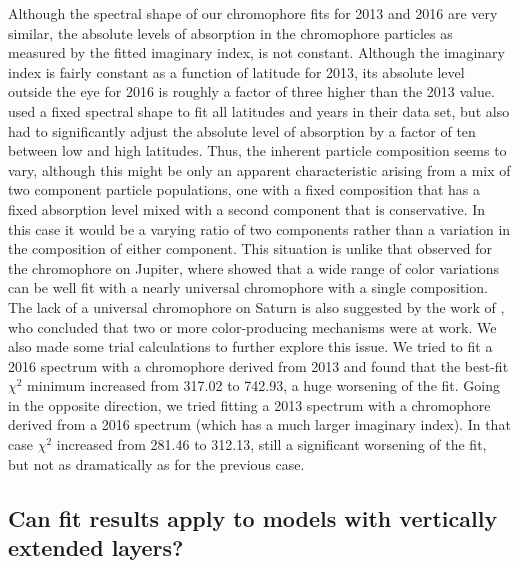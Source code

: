 \documentclass[article,11pt]{emulateapj}
\def\chisq{$\chi^2$ }
\begin{document}
Although the spectral shape of our chromophore fits for 2013 and 2016
are very similar, the absolute levels of absorption in the chromophore
particles as measured by the fitted imaginary index, is not constant.
Although the imaginary index is fairly constant as a function of
latitude for 2013, its absolute level outside the eye for 2016 is
roughly a factor of three higher than the 2013 value. \cite{Kark2005}
used a fixed spectral shape to fit all latitudes and years in their
data set, but also had to significantly adjust the absolute level of
absorption by a factor of ten between low and high latitudes.  Thus,
the inherent particle composition seems to vary, although this might
be only an apparent characteristic arising from a mix of two component
particle populations, one with a fixed composition that has a fixed
absorption level mixed with a second component that is
conservative. In this case it would be a varying ratio of two
components rather than a variation in the composition of either
component.  This situation is unlike that observed for the chromophore
on Jupiter, where \cite{Sro2017red} showed that a wide range of color
variations can be well fit with a nearly universal chromophore with a
single composition.  The lack of a universal chromophore on Saturn is
also suggested by the work of \cite{Braude2019EPSC}, who concluded
that two or more color-producing mechanisms were at work. We also made
some trial calculations to further explore this issue.  We tried to
fit a 2016 spectrum with a chromophore derived from 2013 and found
that the best-fit \chisq minimum increased from 317.02 to 742.93, a
huge worsening of the fit.  Going in the opposite direction, we tried
fitting a 2013 spectrum with a chromophore derived from a 2016
spectrum (which has a much larger imaginary index). In that case
\chisq increased from 281.46 to 312.13, still a significant worsening of the
fit, but not as dramatically as for the previous case.  



\subsection{Can fit results apply to models with vertically extended layers?}\label{Sec:convert}
\end{document}
